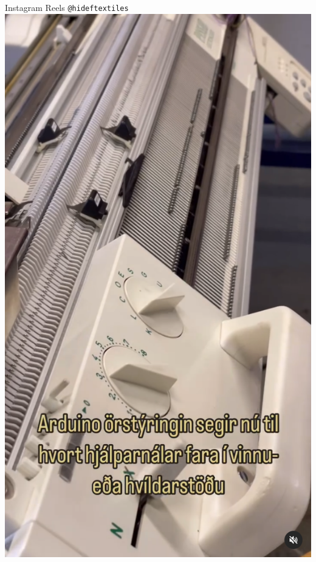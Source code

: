 \documentclass[
    NAME={Dr. Helga Ingimundardóttir},
    EMAIL={helgaingim@hi.is},
    FACULTY={Industrial Engineering},
    TITLE={HiDef Textiles: Reviving Tradition with Innovation},
    SUBTITLE={Empowering Creativity and Sustainability in Textile Production through Digital Transformation},
    SEMINAR={Reykjavík DataBeers},
    DATE={January 25, 2025},
    WIDE={true}
]{HI-LaTeX/hi-beamer}
\begin{document}
    \begin{frame}{Instagram Reels \texttt{@hideftextiles}}
    \centering
        \href{https://www.instagram.com/p/C7kbxeFIKz1/}{\includegraphics[height=0.8\textheight]{include/C7kbxeFIKz1.png}}

\end{frame}
\end{document}
